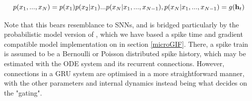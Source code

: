 \documentclass[mphil,deptreport,ianc]{infthesis} %
\begin{document}
\begin{equation}
    p(x_1, ..., x_N) = p(x_1)p(x_2|x_1) ... p(x_N|x_1,...,x_{N-1}), \\
    p(x_N|x_1,...,x_{N-1}) = g(\textbf{h}_t)
\end{equation}

Note that this bears resemblance to SNNs, and is bridged particularly by the probabilistic model version of \cite{Rene2020}, which we have based a spike time and gradient compatible model implementation on in section \ref{microGIF}.
There, a spike train is assumed to be a Bernoulli or Poisson distributed spike history, which may be estimated with the ODE system and its recurrent connections.
However, connections in a GRU system are optimised in a more straightforward manner, with the other parameters and internal dynamics instead being what decides on the "gating".
\end{document}
